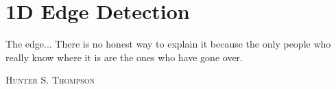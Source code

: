 \newcommand{\smallProfile}[1]
{%
	\begin{tikzpicture}
	\begin{axis}[		
		no markers,
		scale only axis,
		width=\linewidth,
		height=0.5\linewidth,
		xtick=\empty,
		ytick=\empty,
		enlargelimits=false
	]

	\addplot table[x=Index,y=Value] {#1};

	\end{axis}
	\end{tikzpicture}%
}




\chapter{1D Edge Detection} 
\label{chap:1DEdgeDetection}

\epigraph{The edge... There is no honest way to explain it because the only people who really know where it is are the ones who have gone over.}
{\textsc{Hunter S. Thompson}}

\pagebreak







